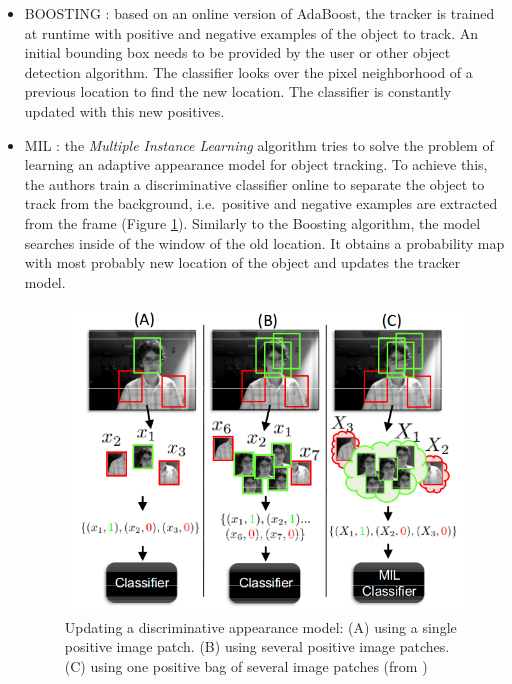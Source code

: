 \begin{itemize}
\item BOOSTING \cite{grabner2006real}: based on an online version of AdaBoost, the tracker is trained at runtime with positive and negative examples of the object to track. An initial bounding box needs to be provided by the user or other object detection algorithm. The classifier looks over the pixel neighborhood of a previous location to find the new location. The classifier is constantly updated with this new positives.
\item MIL \cite{babenko2009visual}: the \textit{Multiple Instance Learning} algorithm tries to solve the problem of learning an adaptive appearance model for object tracking. To achieve this, the authors train a discriminative classifier online to separate the object to track from the background, i.e.\ positive and negative examples are extracted from the frame (Figure \ref{fig:mil}). Similarly to the Boosting algorithm, the model searches inside of the window of the old location. It obtains a probability map with most probably new location of the object and updates the tracker model.
\begin{figure}[h!]
\begin{center}
\includegraphics[scale=0.4]{figures/mil.png}
\caption{Updating a discriminative appearance model: (A) using a single positive image patch. (B) using several positive image patches. (C) using one positive bag of several image patches (from \cite{babenko2009visual})}
\label{fig:mil}
\end{center}
\end{figure}

\end{itemize}
